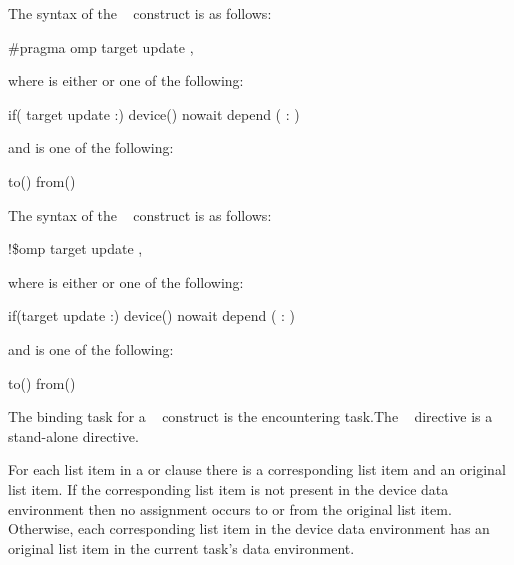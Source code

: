 \syntax
\ccppspecificstart
The syntax of the ~ construct is as follows:

\begin{boxedcode}
\#pragma omp target update \plc{clause[ [},\plc{] clause] ... ] new-line}
\end{boxedcode}
where  is either  or one of the following:

\begin{indentedcodelist}
if(\plc{[} target update :\plc{] scalar-expression})
device()
nowait
depend ( : )
\end{indentedcodelist}

and  is one of the following:

\begin{indentedcodelist}
to()
from()
\end{indentedcodelist}
\ccppspecificend

\fortranspecificstart
The syntax of the ~ construct is as follows:

\begin{boxedcode}
!\$omp target update \plc{clause[ [},\plc{] clause] ... ]}
\end{boxedcode}

where  is either  or one of the following:

\begin{indentedcodelist}
if(\plc{[}target update :\plc{] scalar-logical-expression})
device()
nowait
depend ( : )
\end{indentedcodelist}

and  is one of the following:

\begin{indentedcodelist}
to()
from()
\end{indentedcodelist}
\fortranspecificend

\binding
The binding task for a ~ construct is the encountering task.The 
~ directive is a stand-alone directive.

\descr
For each list item in a  or  clause there is a corresponding list item and an 
original list item. If the corresponding list item is not present in the device data environment then no assignment occurs to or from the original list item. Otherwise, each corresponding list item in the 
device data environment has an original list item in the current task's data environment.

